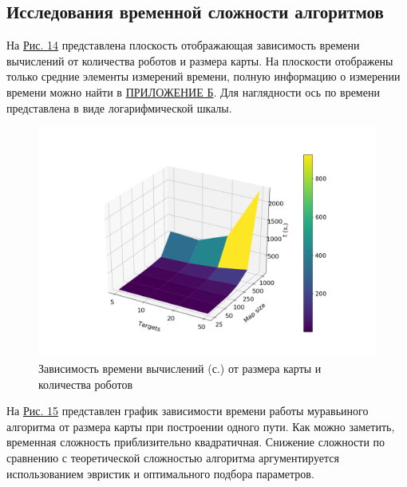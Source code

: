 \documentclass{article}
\numberwithin{equation}{section}
\begin{document}
		\subsection{Исследования временной сложности алгоритмов}

			На \hyperref[fig:time_surface]{Рис. 14} представлена плоскость отображающая зависимость времени вычислений от количества роботов и размера карты. На плоскости отображены только средние элементы измерений времени, полную информацию о измерении времени можно найти в \hyperref[sec:time]{ПРИЛОЖЕНИЕ Б}. Для наглядности ось по времени представлена в виде логарифмической шкалы.

			\begin{figure}[H]
				\centering
				\vspace{-0.5cm}
				\includegraphics[width=\textwidth]{data/mean_surface.png}
				\vspace{-0.5cm}
				\caption{Зависимость времени вычислений (с.) от размера карты и количества роботов}\label{fig:time_surface}
			\end{figure}

			На \hyperref[fig:time_surface]{Рис. 15} представлен график зависимости времени работы муравьиного алгоритма от размера карты при построении одного пути. Как можно заметить, временная сложность приблизительно квадратичная. Снижение сложности по сравнению с теоретической сложностью алгоритма аргументируется использованием эвристик и оптимального подбора параметров.
\end{document}
